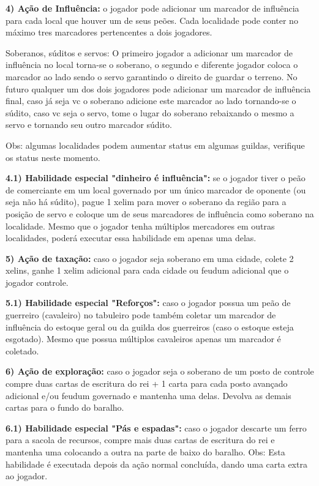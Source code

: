 \documentclass[11pt]{article}
\begin{document}
\textbf{4) Ação de Influência:} o jogador pode adicionar um marcador de influência para cada local que houver um de seus peões. Cada localidade pode conter no máximo tres marcadores
pertencentes a dois jogadores.

Soberanos, súditos e servos: O primeiro jogador a adicionar um marcador de influência no local torna-se o soberano, o segundo e diferente jogador coloca o marcador ao lado sendo
o servo garantindo o direito de guardar o terreno. No futuro qualquer um dos dois jogadores pode adicionar um marcador de influência final, caso já seja vc o soberano adicione este
marcador ao lado tornando-se o súdito, caso vc seja o servo, tome o lugar do soberano rebaixando o mesmo a servo e tornando seu outro marcador súdito.

Obs: algumas localidades podem aumentar status em algumas guildas, verifique os status neste momento.

\textbf{4.1) Habilidade especial "dinheiro é influência":} se o jogador tiver o peão de comerciante em um local governado por um único marcador de oponente (ou seja não há súdito), pague 1 xelim
para mover o soberano da região para a posição de servo e coloque um de seus marcadores de influência como soberano na localidade. Mesmo que o jogador tenha múltiplos mercadores em outras
localidades, poderá executar essa habilidade em apenas uma delas.

\textbf{5) Ação de taxação:} caso o jogador seja soberano em uma cidade, colete 2 xelins, ganhe 1 xelim adicional para cada cidade ou feudum adicional que o jogador controle.

\textbf{5.1) Habilidade especial "Reforços":} caso o jogador possua um peão de guerreiro (cavaleiro) no tabuleiro pode também coletar um marcador de influência do estoque geral ou da
guilda dos guerreiros (caso o estoque esteja esgotado). Mesmo que possua múltiplos cavaleiros apenas um marcador é coletado.

\textbf{6) Ação de exploração:} caso o jogador seja o soberano de um posto de controle compre duas cartas de escritura do rei + 1 carta para cada posto avançado adicional e/ou feudum governado e
mantenha uma delas. Devolva as demais cartas para o fundo do baralho.

\textbf{6.1) Habilidade especial "Pás e espadas":} caso o jogador descarte um ferro para a sacola de recursos, compre mais duas cartas de escritura do rei e mantenha uma colocando a outra na parte de baixo do
baralho. Obs: Esta habilidade é executada depois da ação normal concluída, dando uma carta extra ao jogador.
\end{document}
